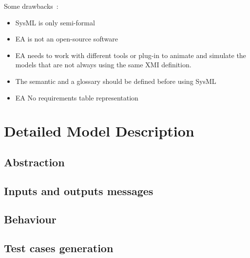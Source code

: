 \documentclass{template/openetcs_article}
\begin{document}
Some drawbacks~:
\begin{itemize}
\item SysML is only semi-formal
\item EA is not an  open-source software
\item EA needs to work with different tools or plug-in to animate and simulate
the models that are not always using the same XMI definition.
\item The semantic and a glossary should be defined before using SysML
\item EA No requirements table representation
\end{itemize}


\section{Detailed Model Description}
\label{sec:deta-model-descr}
  \subsection{Abstraction}
  

  \subsection{Inputs and outputs messages}
  

  \subsection{Behaviour}
  \label{subsec:behavior}
  

  \subsection{Test cases generation}
  \label{subsec:test_generation}
  




\end{document}
